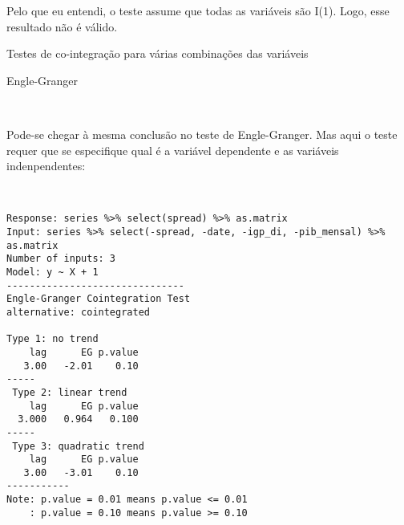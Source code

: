 \documentclass[]{article}
\begin{document}
Pelo que eu entendi, o teste assume que todas as variáveis são I(1).
Logo, esse resultado não é válido.

\newpage

\begin{center}\LARGE{Testes de co-integração para várias combinações das variáveis}\end{center}\begin{center}\large{Engle-Granger}\end{center}

~ ~ ~

Pode-se chegar à mesma conclusão no teste de Engle-Granger. Mas aqui o
teste requer que se especifique qual é a variável dependente e as
variáveis indenpendentes:

~ ~ ~

\begin{verbatim}
Response: series %>% select(spread) %>% as.matrix 
Input: series %>% select(-spread, -date, -igp_di, -pib_mensal) %>% as.matrix 
Number of inputs: 3 
Model: y ~ X + 1 
------------------------------- 
Engle-Granger Cointegration Test 
alternative: cointegrated 

Type 1: no trend 
    lag      EG p.value 
   3.00   -2.01    0.10 
----- 
 Type 2: linear trend 
    lag      EG p.value 
  3.000   0.964   0.100 
----- 
 Type 3: quadratic trend 
    lag      EG p.value 
   3.00   -3.01    0.10 
----------- 
Note: p.value = 0.01 means p.value <= 0.01 
    : p.value = 0.10 means p.value >= 0.10 
\end{verbatim}
\end{document}
